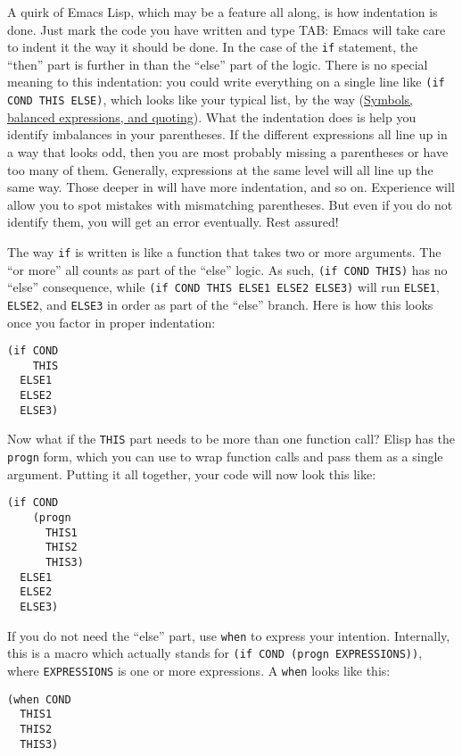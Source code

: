 \documentclass[11pt]{ctexart}
\begin{document}
A quirk of Emacs Lisp, which may be a feature all along, is how indentation is done. Just mark the code you have written and type TAB: Emacs will take care to indent it the way it should be done. In the case of the \texttt{if} statement, the ``then'' part is further in than the ``else'' part of the logic. There is no special meaning to this indentation: you could write everything on a single line like \texttt{(if COND THIS ELSE)}, which looks like your typical list, by the way (\hyperref[sec:org9b7817a]{Symbols, balanced expressions, and quoting}). What the indentation does is help you identify imbalances in your parentheses. If the different expressions all line up in a way that looks odd, then you are most probably missing a parentheses or have too many of them. Generally, expressions at the same level will all line up the same way. Those deeper in will have more indentation, and so on. Experience will allow you to spot mistakes with mismatching parentheses. But even if you do not identify them, you will get an error eventually. Rest assured!

The way \texttt{if} is written is like a function that takes two or more arguments. The ``or more'' all counts as part of the ``else'' logic. As such, \texttt{(if COND THIS)} has no ``else'' consequence, while \texttt{(if COND THIS ELSE1 ELSE2 ELSE3)} will run \texttt{ELSE1}, \texttt{ELSE2}, and \texttt{ELSE3} in order as part of the ``else'' branch. Here is how this looks once you factor in proper indentation:

\begin{verbatim}
(if COND
    THIS
  ELSE1
  ELSE2
  ELSE3)
\end{verbatim}

Now what if the \texttt{THIS} part needs to be more than one function call? Elisp has the \texttt{progn} form, which you can use to wrap function calls and pass them as a single argument. Putting it all together, your code will now look this like:

\begin{verbatim}
(if COND
    (progn
      THIS1
      THIS2
      THIS3)
  ELSE1
  ELSE2
  ELSE3)
\end{verbatim}

If you do not need the ``else'' part, use \texttt{when} to express your intention. Internally, this is a macro which actually stands for \texttt{(if COND (progn EXPRESSIONS))}, where \texttt{EXPRESSIONS} is one or more expressions. A \texttt{when} looks like this:

\begin{verbatim}
(when COND
  THIS1
  THIS2
  THIS3)
\end{verbatim}
\end{document}
